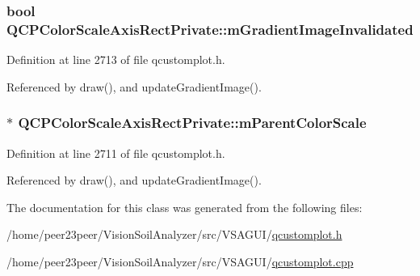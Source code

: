 \subsubsection[{m\+Gradient\+Image\+Invalidated}]{\setlength{\rightskip}{0pt plus 5cm}bool Q\+C\+P\+Color\+Scale\+Axis\+Rect\+Private\+::m\+Gradient\+Image\+Invalidated\hspace{0.3cm}{\ttfamily [protected]}}\label{class_q_c_p_color_scale_axis_rect_private_a2c0b15b071e1f93006b48b5be022a631}


Definition at line 2713 of file qcustomplot.\+h.



Referenced by draw(), and update\+Gradient\+Image().

\hypertarget{class_q_c_p_color_scale_axis_rect_private_a311c73f51a4cb0b556388197833cf099}{}
\subsubsection[{m\+Parent\+Color\+Scale}]{$\ast$ Q\+C\+P\+Color\+Scale\+Axis\+Rect\+Private\+::m\+Parent\+Color\+Scale\hspace{0.3cm}{\ttfamily [protected]}}\label{class_q_c_p_color_scale_axis_rect_private_a311c73f51a4cb0b556388197833cf099}


Definition at line 2711 of file qcustomplot.\+h.



Referenced by draw(), and update\+Gradient\+Image().



The documentation for this class was generated from the following files\+:\begin{DoxyCompactItemize}
\item 
/home/peer23peer/\+Vision\+Soil\+Analyzer/src/\+V\+S\+A\+G\+U\+I/\hyperlink{qcustomplot_8h}{qcustomplot.\+h}\item 
/home/peer23peer/\+Vision\+Soil\+Analyzer/src/\+V\+S\+A\+G\+U\+I/\hyperlink{qcustomplot_8cpp}{qcustomplot.\+cpp}\end{DoxyCompactItemize}
